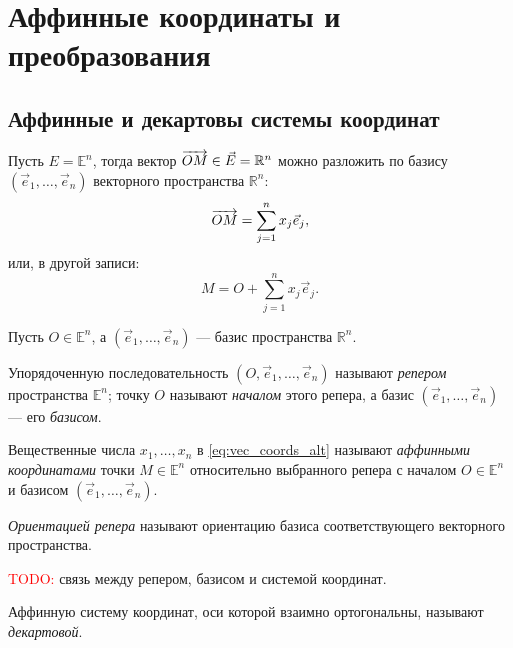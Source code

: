 \section{Аффинные координаты и преобразования}

\subsection{Аффинные и декартовы системы координат}

Пусть $E = \mathbb{E}^n$, тогда вектор $\overrightarrow{OM} \in \vec{E} = \mathbb{R}^n$
можно разложить по базису $(\vec{e}_1, \dots, \vec{e}_n)$ векторного
пространства $\mathbb{R}^n$:
\begin{equation}
  \label{eq:vec_coords}
  \overrightarrow{OM} = \sum_{j=1}^n x_j \vec{e}_j,
\end{equation}
или, в другой записи:
\begin{equation}
  \label{eq:vec_coords_alt}
  M = O + \sum_{j=1}^n x_j \vec{e}_j.
\end{equation}

Пусть $O \in \mathbb{E}^n$, а $(\vec{e}_1, \dots, \vec{e}_n)$ --- базис
пространства $\mathbb{R}^n$.
\begin{definition}
  Упорядоченную последовательность $(O, \vec{e}_1, \dots, \vec{e}_n)$ называют
  \textit{репером} пространства $\mathbb{E}^n$; точку $O$ называют
  \textit{началом} этого репера, а базис $(\vec{e}_1, \dots, \vec{e}_n)$ ---
  его \textit{базисом}.
\end{definition}

\begin{definition}
  Вещественные числа $x_1, \dots, x_n$ в \ref{eq:vec_coords_alt} называют
  \textit{аффинными координатами} точки $M \in \mathbb{E}^n$ относительно
  выбранного репера с началом $O \in \mathbb{E}^n$ и базисом
  $(\vec{e}_1, \dots, \vec{e}_n)$.
\end{definition}

\begin{definition}
  \textit{Ориентацией репера} называют ориентацию базиса соответствующего
  векторного пространства.
\end{definition}

\textcolor{red}{TODO:} связь между репером, базисом и системой координат.

\begin{definition}
  Аффинную систему координат, оси которой взаимно ортогональны, называют
  \textit{декартовой}.
\end{definition}

